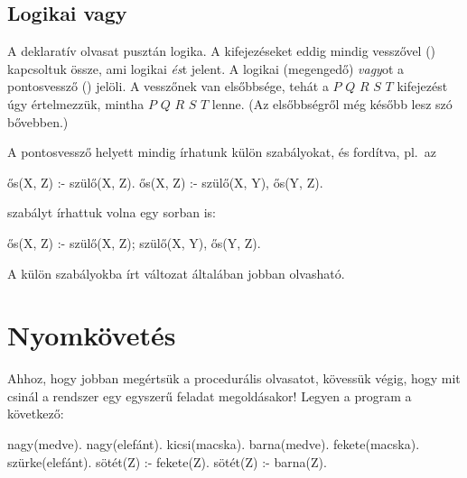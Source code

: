 \subsection*{Logikai vagy}
A deklaratív olvasat pusztán logika. A kifejezéseket
eddig mindig vesszővel (\pr{,}) kapcsoltuk össze,
ami logikai \emph{és}\/t jelent. A logikai
(megengedő) \emph{vagy}\/ot a pontosvessző (\pr{;})
jelöli. A vesszőnek van elsőbbsége, tehát a $P$ \pr{:-}
$Q$\pr{,} $R$\pr{;} $S$\pr{,} $T$ kifejezést
úgy értelmezzük, mintha
$P$ \pr{:-} \pr{(}$Q$\pr{,} $R$\pr{);} \pr{(}$S$\pr{,} $T$
lenne. (Az elsőbbségről
még később lesz szó bővebben.)\index{\pr{;}}

A pontosvessző helyett mindig írhatunk külön
szabályokat, és fordítva, pl.~az
\begin{program}
ős(X, Z) :- szülő(X, Z).
ős(X, Z) :- szülő(X, Y), ős(Y, Z).
\end{program}
szabályt írhattuk volna egy sorban is:
\begin{program}
ős(X, Z) :- szülő(X, Z); szülő(X, Y), ős(Y, Z).
\end{program}
A külön szabályokba írt változat általában jobban
olvasható.

\section{Nyomkövetés}
Ahhoz, hogy jobban megértsük a procedurális
olvasatot, kövessük végig, hogy mit csinál a
rendszer egy egyszerű feladat megoldásakor! Legyen a
program a következő:
\begin{program}
nagy(medve).
nagy(elefánt).
kicsi(macska).
barna(medve).
fekete(macska).
szürke(elefánt).
sötét(Z) :- fekete(Z).
sötét(Z) :- barna(Z).
\end{program}

